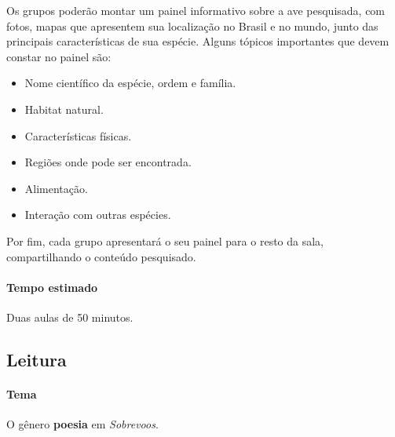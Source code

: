 \documentclass[11pt]{extarticle}
\begin{document}

Os grupos poderão montar um painel informativo sobre a ave pesquisada, com fotos, mapas que apresentem sua localização no Brasil e no mundo, junto das principais características de sua espécie. Alguns tópicos importantes que devem constar no painel são:

\begin{itemize}

\item Nome científico da espécie, ordem e família.

\item Habitat natural.

\item Características físicas.

\item Regiões onde pode ser encontrada.

\item Alimentação.

\item Interação com outras espécies.

\end{itemize}


Por fim, cada grupo apresentará o seu painel para o resto da sala, compartilhando o conteúdo pesquisado.

\paragraph{Tempo estimado} Duas aulas de 50 minutos.

\subsection{Leitura}


\paragraph{Tema} O gênero \textbf{poesia} em \textit{Sobrevoos}.
\end{document}
